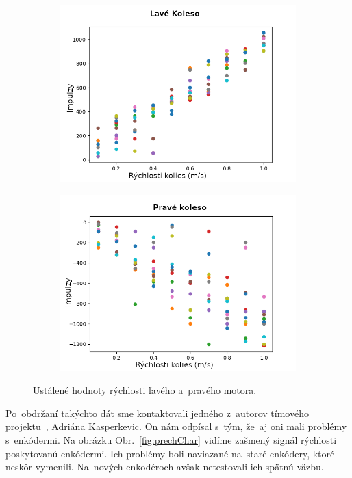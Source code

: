 \begin{figure}[!htbp]
	\begin{subfigure}{0.5\textwidth}
		\includegraphics[width=\textwidth]{img/Left_wheel_2.png}
	\end{subfigure}
	\hfill
	\begin{subfigure}{0.5\textwidth}
		\includegraphics[width=\textwidth]{img/Right_wheel_2.png}
	\end{subfigure}
	\caption{Ustálené hodnoty rýchlosti ľavého a~pravého motora. }
	\label{fig:lavePraveKoleso}
\end{figure}

Po~obdržaní takýchto dát sme kontaktovali jedného z~autorov tímového projektu~\cite{timovyProjekt}, Adriána Kasperkevic. On nám odpísal s~tým,
že~aj oni mali problémy s~enkódermi. Na obrázku Obr.~\ref{fig:prechChar} vidíme zašmený signál rýchlosti poskytovanú enkódermi. Ich problémy
boli naviazané na~staré enkódery, ktoré neskôr vymenili. Na~nových enkodéroch avšak netestovali ich spätnú väzbu.

